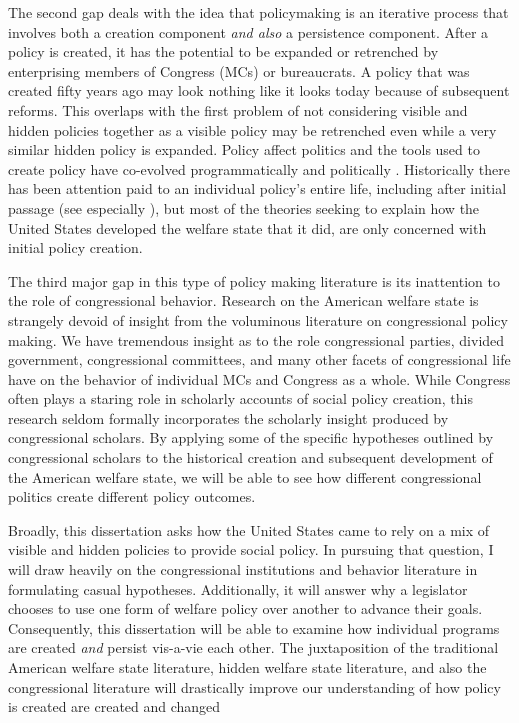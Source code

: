 \documentclass[12pt]{article}
\begin{document}
The second gap deals with the idea that policymaking is an iterative process that involves both a creation component \emph{and also} a persistence component. After a policy is created, it has the potential to be expanded or retrenched by enterprising members of Congress (MCs) or bureaucrats. A policy that was created fifty years ago may look nothing like it looks today because of subsequent reforms. This overlaps with the first problem of not considering visible and hidden policies together as a visible policy may be retrenched even while a very similar hidden policy is expanded. Policy affect politics and the tools used to create policy have co-evolved programmatically and politically \citep{schattschneider1960, skocpol1995}.  Historically there has been attention paid to an individual policy's entire life, including after initial passage (see especially \cite{derthick1979, hacker2002}), but most of the theories seeking to explain how the United States developed the welfare state that it did, are only concerned with initial policy creation. 

The third major gap in this type of policy making literature is its inattention to the role of congressional behavior. Research on the American welfare state is strangely devoid of insight from the voluminous literature on congressional policy making. We have tremendous insight as to the role congressional parties, divided government, congressional committees, and many other facets of congressional life have on the behavior of individual MCs and Congress as a whole. While Congress often plays a staring role in scholarly accounts of social policy creation, this research seldom formally incorporates the scholarly insight produced by congressional scholars. By applying some of the specific hypotheses outlined by congressional scholars to the historical creation and subsequent development of the American welfare state, we will be able to see how different congressional politics create different policy outcomes.

Broadly, this dissertation asks how the United States came to rely on a mix of visible and hidden policies to provide social policy. In pursuing that question, I will draw heavily on the congressional institutions and behavior literature in formulating casual hypotheses. Additionally, it will answer why a legislator chooses to use one form of welfare policy over another to advance their goals. Consequently, this dissertation will be able to examine how individual programs are created \emph{and} persist vis-a-vie each other. The juxtaposition of the traditional American welfare state literature, hidden welfare state literature, and also the congressional literature will drastically improve our understanding of how policy is created are created and changed 
\end{document}
